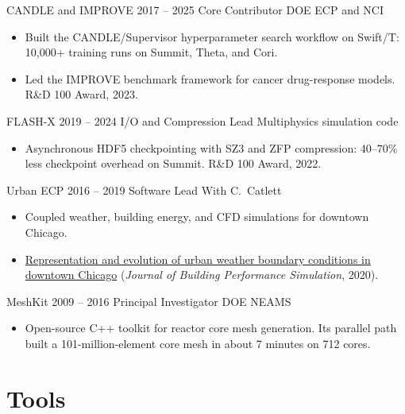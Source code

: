 \documentclass[10pt,letterpaper]{article}
\begin{document}
\entryheader
  {CANDLE and IMPROVE}
  {2017 -- 2025}
  {Core Contributor}
  {DOE ECP and NCI}
\begin{itemize}
  \item Built the CANDLE/Supervisor hyperparameter search workflow on Swift/T: 10,000+ training runs on Summit, Theta, and Cori.
  \item Led the IMPROVE benchmark framework for cancer drug-response models. R\&D 100 Award, 2023.
\end{itemize}

\entryheader
  {FLASH-X}
  {2019 -- 2024}
  {I/O and Compression Lead}
  {Multiphysics simulation code}
\begin{itemize}
  \item Asynchronous HDF5 checkpointing with SZ3 and ZFP compression: 40--70\% less checkpoint overhead on Summit. R\&D 100 Award, 2022.
\end{itemize}

\entryheader
  {Urban ECP}
  {2016 -- 2019}
  {Software Lead}
  {With C.~Catlett}
\begin{itemize}
  \item Coupled weather, building energy, and CFD simulations for downtown Chicago.
  \item \href{https://doi.org/10.1080/19401493.2018.1534275}{Representation and evolution of urban weather boundary conditions in downtown Chicago} (\textit{Journal of Building Performance Simulation}, 2020).
\end{itemize}

\entryheader
  {MeshKit}
  {2009 -- 2016}
  {Principal Investigator}
  {DOE NEAMS}
\begin{itemize}
  \item Open-source C++ toolkit for reactor core mesh generation. Its parallel path built a 101-million-element core mesh in about 7 minutes on 712 cores.
\end{itemize}

\section{Tools}
\end{document}
